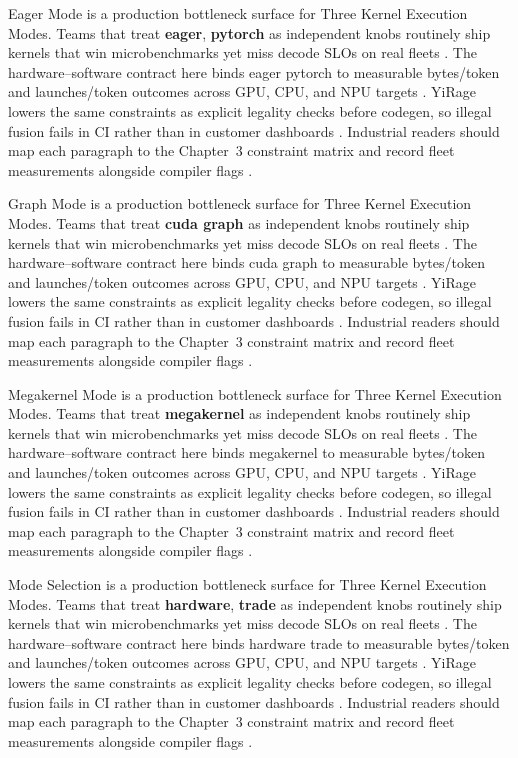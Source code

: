 Eager Mode is a production bottleneck surface for Three Kernel Execution Modes. Teams that treat \textbf{eager}, \textbf{pytorch} as independent knobs routinely ship kernels that win microbenchmarks yet miss decode SLOs on real fleets \citep{patel2025llminference,nvidia2022hopper}. The hardware--software contract here binds eager pytorch to measurable bytes/token and launches/token outcomes across GPU, CPU, and NPU targets \citep{taxbreak2026,semianalysis2024tma}. YiRage lowers the same constraints as explicit legality checks before codegen, so illegal fusion fails in CI rather than in customer dashboards \citep{memoryfloor2026,amd2024xdna}. Industrial readers should map each paragraph to the Chapter~3 constraint matrix and record fleet measurements alongside compiler flags \citep{nvidia2022hopper,amd2024aie}.

Graph Mode is a production bottleneck surface for Three Kernel Execution Modes. Teams that treat \textbf{cuda graph} as independent knobs routinely ship kernels that win microbenchmarks yet miss decode SLOs on real fleets \citep{taxbreak2026,semianalysis2024tma}. The hardware--software contract here binds cuda graph to measurable bytes/token and launches/token outcomes across GPU, CPU, and NPU targets \citep{memoryfloor2026,amd2024xdna}. YiRage lowers the same constraints as explicit legality checks before codegen, so illegal fusion fails in CI rather than in customer dashboards \citep{nvidia2022hopper,amd2024aie}. Industrial readers should map each paragraph to the Chapter~3 constraint matrix and record fleet measurements alongside compiler flags \citep{semianalysis2024tma,dlbook}.

Megakernel Mode is a production bottleneck surface for Three Kernel Execution Modes. Teams that treat \textbf{megakernel} as independent knobs routinely ship kernels that win microbenchmarks yet miss decode SLOs on real fleets \citep{memoryfloor2026,amd2024xdna}. The hardware--software contract here binds megakernel to measurable bytes/token and launches/token outcomes across GPU, CPU, and NPU targets \citep{nvidia2022hopper,amd2024aie}. YiRage lowers the same constraints as explicit legality checks before codegen, so illegal fusion fails in CI rather than in customer dashboards \citep{semianalysis2024tma,dlbook}. Industrial readers should map each paragraph to the Chapter~3 constraint matrix and record fleet measurements alongside compiler flags \citep{amd2024xdna,dao2022flashattention}.

Mode Selection is a production bottleneck surface for Three Kernel Execution Modes. Teams that treat \textbf{hardware}, \textbf{trade} as independent knobs routinely ship kernels that win microbenchmarks yet miss decode SLOs on real fleets \citep{nvidia2022hopper,amd2024aie}. The hardware--software contract here binds hardware trade to measurable bytes/token and launches/token outcomes across GPU, CPU, and NPU targets \citep{semianalysis2024tma,dlbook}. YiRage lowers the same constraints as explicit legality checks before codegen, so illegal fusion fails in CI rather than in customer dashboards \citep{amd2024xdna,dao2022flashattention}. Industrial readers should map each paragraph to the Chapter~3 constraint matrix and record fleet measurements alongside compiler flags \citep{amd2024aie,kwon2023vllm}.

